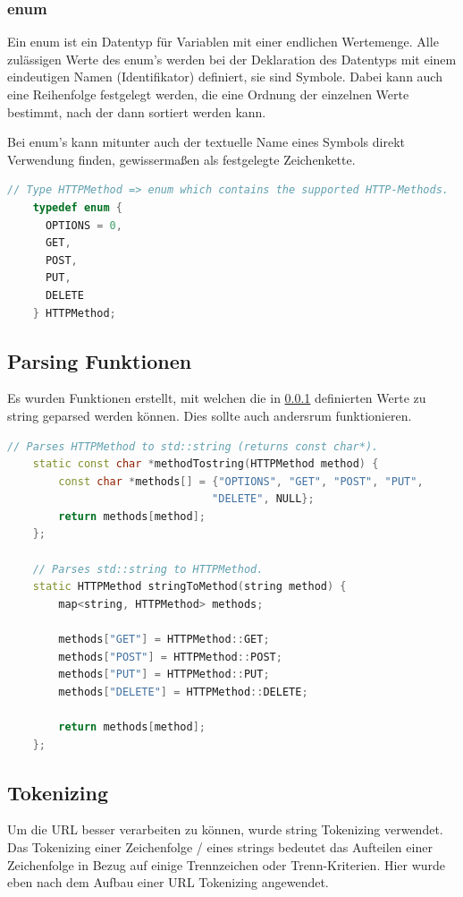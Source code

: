 \documentclass{article}
\begin{document}
\subsubsection{enum}
\label{enum}
Ein enum ist ein Datentyp für Variablen mit einer endlichen Wertemenge. Alle zulässigen Werte des enum's werden bei der Deklaration des Datentyps mit einem eindeutigen Namen (Identifikator) definiert, sie sind Symbole. Dabei kann auch eine Reihenfolge festgelegt werden, die eine Ordnung der einzelnen Werte bestimmt, nach der dann sortiert werden kann.

\noindent Bei enum's kann mitunter auch der textuelle Name eines Symbols direkt Verwendung finden, gewissermaßen als festgelegte Zeichenkette. \cite{enumref}

\begin{lstlisting}[language=C++]
// Type HTTPMethod => enum which contains the supported HTTP-Methods.
    typedef enum {
      OPTIONS = 0,
      GET,
      POST,
      PUT,
      DELETE
    } HTTPMethod;
\end{lstlisting}

\subsection{Parsing Funktionen}
Es wurden Funktionen erstellt, mit welchen die in \ref{enum} definierten Werte zu string geparsed werden können. Dies sollte auch andersrum funktionieren.

\begin{lstlisting}[language=C++]
// Parses HTTPMethod to std::string (returns const char*).
    static const char *methodTostring(HTTPMethod method) {
        const char *methods[] = {"OPTIONS", "GET", "POST", "PUT", 
                                "DELETE", NULL};
        return methods[method];
    };

    // Parses std::string to HTTPMethod.
    static HTTPMethod stringToMethod(string method) {
        map<string, HTTPMethod> methods;

        methods["GET"] = HTTPMethod::GET;
        methods["POST"] = HTTPMethod::POST;
        methods["PUT"] = HTTPMethod::PUT;
        methods["DELETE"] = HTTPMethod::DELETE;

        return methods[method];
    }; 
\end{lstlisting}


\newpage
\subsection{Tokenizing}
\label{tokenizer}
Um die URL besser verarbeiten zu können, wurde string Tokenizing verwendet. Das Tokenizing einer Zeichenfolge / eines strings bedeutet das Aufteilen einer Zeichenfolge in Bezug auf einige Trennzeichen oder Trenn-Kriterien. Hier wurde eben nach dem Aufbau einer URL Tokenizing angewendet.
\end{document}
